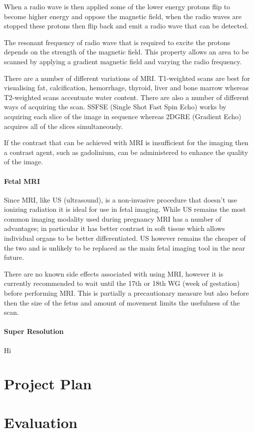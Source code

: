 \documentclass[
  oneside,
  11pt, a4paper,
  footinclude=true,
  headinclude=true,
  cleardoublepage=empty
]{scrbook}
\begin{document}
When a radio wave is then applied some of the lower energy protons flip to become higher energy and oppose the magnetic field, when the radio waves are stopped these protons then flip back and emit a radio wave that can be detected.

The resonant frequency of radio wave that is required to excite the protons depends on the strength of the magnetic field. This property allows an area to be scanned by applying a gradient magnetic field and varying the radio frequency.

There are a number of different variations of MRI. T1-weighted scans are best for visualising fat, calcification, hemorrhage, thyroid, liver and bone marrow whereas T2-weighted scans accentuate water content.
There are also a number of different ways of acquiring the scan. SSFSE (Single Shot Fast Spin Echo) works by acquiring each slice of the image in sequence whereas 2DGRE (Gradient Echo) acquires all of the slices simultaneously.

If the contrast that can be achieved with MRI is insufficient for the imaging then a contrast agent, such as gadolinium, can be administered to enhance the quality of the image.

\subsubsection{Fetal MRI\cite{fetalmri}}

Since MRI, like US (ultrasound), is a non-invasive procedure that doesn’t use ionizing radiation it is ideal for use in fetal imaging. While US remains the most common imaging modality used during pregnancy MRI has a number of advantages; in particular it has better contrast in soft tissue which allows individual organs to be better differentiated. US however remains the cheaper of the two and is unlikely to be replaced as the main fetal imaging tool in the near future.

There are no known side effects associated with using MRI, however it is currently recommended to wait until the 17th or 18th WG (week of gestation) before performing MRI. This is partially a precautionary measure but also before then the size of the fetus and amount of movement limits the usefulness of the scan.

\subsubsection{Super Resolution\cite{superresolution1}\cite{superresolution2}}
Hi


\chapter{Project Plan}

\chapter{Evaluation}

 

    
\end{document}
